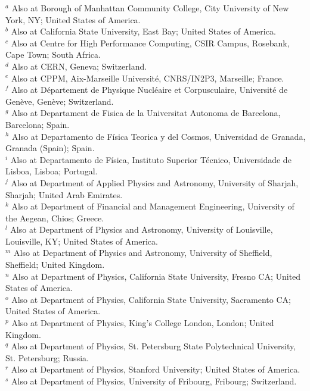\begin{flushleft}
$^{a}$ Also at Borough of Manhattan Community College, City University of New York, NY; United States of America.\\
$^{b}$ Also at California State University, East Bay; United States of America.\\
$^{c}$ Also at Centre for High Performance Computing, CSIR Campus, Rosebank, Cape Town; South Africa.\\
$^{d}$ Also at CERN, Geneva; Switzerland.\\
$^{e}$ Also at CPPM, Aix-Marseille Universit\'e, CNRS/IN2P3, Marseille; France.\\
$^{f}$ Also at D\'epartement de Physique Nucl\'eaire et Corpusculaire, Universit\'e de Gen\`eve, Gen\`eve; Switzerland.\\
$^{g}$ Also at Departament de Fisica de la Universitat Autonoma de Barcelona, Barcelona; Spain.\\
$^{h}$ Also at Departamento de F\'isica Teorica y del Cosmos, Universidad de Granada, Granada (Spain); Spain.\\
$^{i}$ Also at Departamento de Física, Instituto Superior Técnico, Universidade de Lisboa, Lisboa; Portugal.\\
$^{j}$ Also at Department of Applied Physics and Astronomy, University of Sharjah, Sharjah; United Arab Emirates.\\
$^{k}$ Also at Department of Financial and Management Engineering, University of the Aegean, Chios; Greece.\\
$^{l}$ Also at Department of Physics and Astronomy, University of Louisville, Louisville, KY; United States of America.\\
$^{m}$ Also at Department of Physics and Astronomy, University of Sheffield, Sheffield; United Kingdom.\\
$^{n}$ Also at Department of Physics, California State University, Fresno CA; United States of America.\\
$^{o}$ Also at Department of Physics, California State University, Sacramento CA; United States of America.\\
$^{p}$ Also at Department of Physics, King's College London, London; United Kingdom.\\
$^{q}$ Also at Department of Physics, St. Petersburg State Polytechnical University, St. Petersburg; Russia.\\
$^{r}$ Also at Department of Physics, Stanford University; United States of America.\\
$^{s}$ Also at Department of Physics, University of Fribourg, Fribourg; Switzerland.\\

\end{flushleft}

